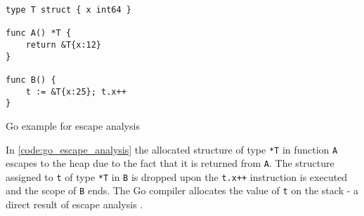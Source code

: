 \begin{listing}[H] 
    \begin{verbatim} 
type T struct { x int64 }

func A() *T {
    return &T{x:12}
}

func B() {
    t := &T{x:25}; t.x++
}
    \end{verbatim}
    \caption{Go example for escape analysis}
    \label{code:go_escape_analysis}
\end{listing}

In \autoref{code:go_escape_analysis} the allocated structure of type
\texttt{*T} in function \texttt{A} escapes to the heap due to the fact that it
is returned from \texttt{A}. The structure assigned to \texttt{t} of type
\texttt{*T} in \texttt{B} is dropped upon the \texttt{t.x++}
instruction is executed and the scope of \texttt{B} ends. The Go compiler
allocates the value of \texttt{t} on the stack - a direct result of escape
analysis \cite{go-escape}.
